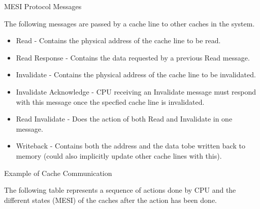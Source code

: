 \documentclass[notes, xcolor = dvipsnames]{beamer}
\begin{document}
    \begin{frame}{MESI Protocol Messages}

        The following messages are passed by a cache line to other caches in the system. 
        \begin{itemize}
            \item Read - Contains the physical address of the cache line to be read. 
            \item Read Response - Contains the data requested by a previous Read message.
            \item Invalidate - Contains the physical address of the cache line to be invalidated. 
            \item Invalidate Acknowledge - CPU receiving an Invalidate message must respond with this message once the specfied cache line is invalidated.
            \item Read Invalidate - Does the action of both Read and Invalidate in one message. 
            \item Writeback - Contains both the address and the data tobe written back to memory (could also implicitly update other cache lines with this).
        \end{itemize}
        
    \end{frame}

    \begin{frame}{Example of Cache Communication}

        The following table represents a sequence of actions done by CPU and the different states (MESI) of the caches after the action has been done. 
        \begin{figure}
        \end{figure}
        
    \end{frame}
\end{document}
